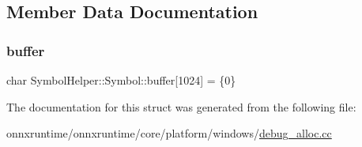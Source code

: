 \subsection{Member Data Documentation}
\mbox{\label{structSymbolHelper_1_1Symbol_a6c4668d294f65cc22302b3fd93a7fffd}} 
\subsubsection{\texorpdfstring{buffer}{buffer}}
{\footnotesize\ttfamily char Symbol\+Helper\+::\+Symbol\+::buffer\mbox{[}1024\mbox{]} = \{0\}}



The documentation for this struct was generated from the following file\+:\begin{DoxyCompactItemize}
\item 
onnxruntime/onnxruntime/core/platform/windows/\mbox{\hyperlink{debug__alloc_8cc}{debug\+\_\+alloc.\+cc}}\end{DoxyCompactItemize}
